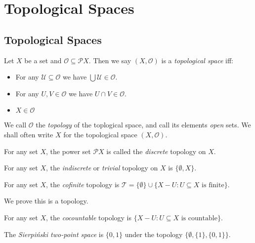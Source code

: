 
\chapter{Topological Spaces}

\section{Topological Spaces}

\begin{df}
Let $X$ be a set and $\mathcal{O} \subseteq \mathcal{P} X$. Then we say $(X, \mathcal{O})$ is a \emph{topological space} iff:
\begin{itemize}
\item For any $\mathcal{U} \subseteq \mathcal{O}$ we have $\bigcup \mathcal{U} \in \mathcal{O}$.
\item For any $U, V \in \mathcal{O}$ we have $U \cap V \in \mathcal{O}$.
\item $X \in \mathcal{O}$
\end{itemize}
We call $\mathcal{O}$ the \emph{topology} of the toplogical space, and call its elements \emph{open} sets. We shall often write $X$ for the topological space $(X, \mathcal{O})$.
\end{df}

\begin{ex}
For any set $X$, the power set $\mathcal{P} X$ is called the \emph{discrete} topology on $X$.
\end{ex}

\begin{ex}
For any set $X$, the \emph{indiscrete} or \emph{trivial} topology on $X$ is  $\{ \emptyset, X \}$.
\end{ex}

\begin{ex}
For any set $X$, the \emph{cofinite} topology is $\mathcal{T} = \{\emptyset\} \cup \{ X - U : U \subseteq X \text{ is finite} \}$.

We prove this is a topology.
\end{ex}

\begin{ex}
For any set $X$, the \emph{cocountable} topology is $\{ X - U : U \subseteq X \text{ is countable} \}$.
\end{ex}

\begin{ex}
The \emph{Sierpi\'{n}ski two-point space} is $\{0,1\}$ under the topology $\{ \emptyset, \{1\}, \{0,1\} \}$.
\end{ex}

